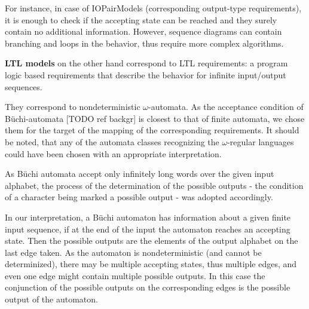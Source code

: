 For instance, in case of IOPairModels (corresponding output-type requirements), it is enough to check if the accepting state can be reached and they surely contain no additional information. However, sequence diagrams can contain branching and loops in the behavior, thus require more complex algorithms.



\textbf{LTL models} on the other hand correspond to LTL requirements: a program logic based requirements that describe the behavior for infinite input/output sequences.%

They correspond to nondeterministic $\omega$-automata. As the acceptance condition of Büchi-automata [TODO ref backgr] is closest to that of finite automata, we chose them for the target of the mapping of the corresponding requirements. It should be noted, that any of the automata classes recognizing the $\omega$-regular languages could have been chosen with an appropriate interpretation.

As Büchi automata accept only infinitely long words over the given input alphabet, the process of the determination of the possible outputs - the condition of a character being marked a possible output - was adopted accordingly.

In our interpretation, a Büchi automaton has information about a given finite input sequence, if at the end of the input the automaton reaches an accepting state. Then the possible outputs are the elements of the output alphabet on the last edge taken. As the automaton is nondeterministic (and cannot be determinized), there may be multiple accepting states, thus multiple edges, and even one edge might contain multiple possible outputs. In this case the conjunction of the possible outputs on the corresponding edges is the possible output of the automaton.  

